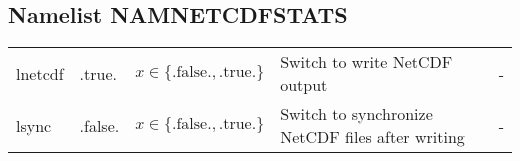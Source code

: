 \documentclass[twoside,11pt,fleqn,a4paper,english,openright]{report}
\begin{document}
\subsection{Namelist NAMNETCDFSTATS}\label{par:netcdf}
\begin{center}
  \tablelasttail{
        &&&&\\\hline
  }
\begin{supertabular}{|l|p{1.6cm}|p{4cm}|p{6cm}|l|}
lnetcdf	& .true. & $x\in\{\text{.false.},\text{.true.}\}$	& Switch to write NetCDF output	& -\\
lsync	& .false. & $x\in\{\text{.false.},\text{.true.}\}$	& Switch to synchronize NetCDF files after writing & -\\
\end{supertabular}
\end{center}
\end{document}

